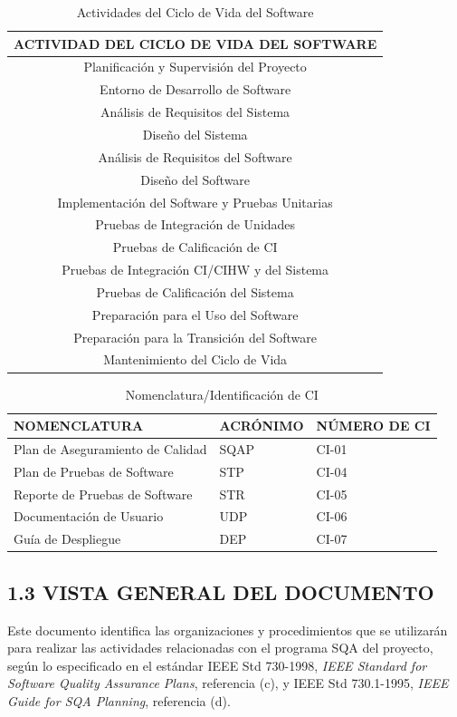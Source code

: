 \begin{table}[H]
\centering
\caption{Actividades del Ciclo de Vida del Software}
\label{tab:lifecycle}
\begin{tabular}{|c|}
\hline
\textbf{ACTIVIDAD DEL CICLO DE VIDA DEL SOFTWARE} \\
\hline
Planificación y Supervisión del Proyecto \\
\hline
Entorno de Desarrollo de Software \\
\hline
Análisis de Requisitos del Sistema \\
\hline
Diseño del Sistema \\
\hline
Análisis de Requisitos del Software \\
\hline
Diseño del Software \\
\hline
Implementación del Software y Pruebas Unitarias \\
\hline
Pruebas de Integración de Unidades \\
\hline
Pruebas de Calificación de CI \\
\hline
Pruebas de Integración CI/CIHW y del Sistema \\
\hline
Pruebas de Calificación del Sistema \\
\hline
Preparación para el Uso del Software \\
\hline
Preparación para la Transición del Software \\
\hline
Mantenimiento del Ciclo de Vida \\
\hline
\end{tabular}
\end{table}

\begin{table}[H]
\centering
\caption{Nomenclatura/Identificación de CI}
\label{tab:ci}
\begin{tabular}{|p{4cm}|p{3cm}|p{3cm}|}
\hline
\textbf{NOMENCLATURA} & \textbf{ACRÓNIMO} & \textbf{NÚMERO DE CI} \\
\hline
Plan de Aseguramiento de Calidad & SQAP & CI-01 \\
\hline
Plan de Pruebas de Software & STP & CI-04 \\
\hline
Reporte de Pruebas de Software & STR & CI-05 \\
\hline
Documentación de Usuario & UDP & CI-06 \\
\hline
Guía de Despliegue & DEP & CI-07 \\
\hline
\end{tabular}
\end{table}

\subsection{1.3 VISTA GENERAL DEL DOCUMENTO}
Este documento identifica las organizaciones y procedimientos que se utilizarán para realizar las actividades relacionadas con el programa SQA del proyecto, según lo especificado en el estándar IEEE Std 730-1998, \textit{IEEE Standard for Software Quality Assurance Plans}, referencia (c), y IEEE Std 730.1-1995, \textit{IEEE Guide for SQA Planning}, referencia (d).

